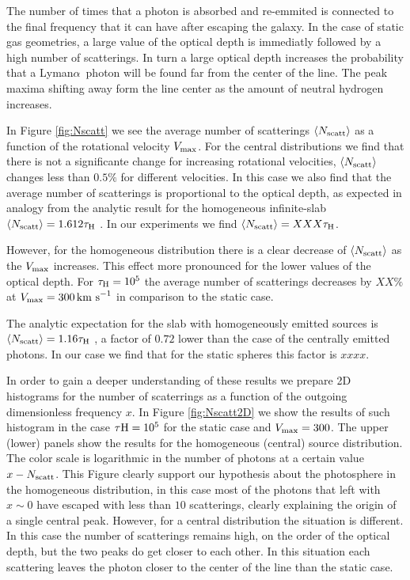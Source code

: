 \documentclass[usenatbib]{mn2e}
\newcommand{\ly}{{\ifmmode{{\rm Ly}\alpha~}\else{Ly$\alpha$~}\fi}}
\newcommand{\lya}{{Lyman$\alpha$~}}
\newcommand{\kms}{{\ifmmode{{\mathrm{\,km\ s}^{-1}}}\else{\,km~s$^{-1}$}\fi}}
\begin{document}
The number of times that a \ly photon is absorbed and re-emmited is
connected to the final frequency that it can have after escaping the
galaxy. In the case of static gas geometries, a large value of the
optical depth is immediatly followed by a high number of
scatterings. In turn a large optical depth increases the probability
that a \lya photon will be found far from the center of the line. The
peak maxima shifting away form the line center as the amount of
neutral hydrogen increases.


In Figure \ref{fig:Nscatt} we see the average number of scatterings
$\langle N_{\rm scatt}\rangle$ as a function of the rotational velocity
$V_{\rm max}$. For the central distributions we find that there is not
a significante change for increasing rotational
velocities, $\langle N_{\rm scatt}\rangle$ changes less than $0.5\%$
for different velocities. In this case we also find that the average
number of scatterings is proportional to the optical depth, as
expected in analogy from the analytic result for the homogeneous
infinite-slab $\langle N_{\rm  scatt}\rangle=1.612\tau_{\rm   H}$
\citep{Adams72,Harrington73}. In our experiments we find  $\langle N_{\rm
  scatt}\rangle= XXX\tau_{\rm   H}$. 


However, for the homogeneous distribution there is a clear decrease of
$\langle N_{\rm  scatt}\rangle$ as the  $V_{\rm max}$ increases. This
effect more pronounced for the lower values of the optical depth. For
$\tau_{\rm H}=10^5$ the average number of scatterings decreases by
$XX\%$ at $V_{\rm max}=300\kms$ in comparison to the static case.


The analytic expectation for the slab with homogeneously emitted
sources is $\langle N_{\rm  scatt}\rangle=1.16\tau_{\rm   H}$
\citep{Harrington73}, a factor of $0.72$ lower than the case of the
centrally emitted photons. In our case we find that for the static
spheres this factor is $xxxx$.

In order to gain a deeper understanding of these results we prepare 2D
histograms for the number of scaterrings as a function of the outgoing
dimensionless frequency $x$. In Figure \ref{fig:Nscatt2D} we show
the results of such histogram in the case $\tau{\rm H}=10^5$ for the
static case and $V_{\rm max}=300$\kms. The upper (lower) panels show the
results for the homogeneous (central) source distribution. The color
scale is logarithmic in the number of photons at a certain value
$x-N_{\rm scatt}$. This Figure clearly support our hypothesis about
the photosphere in the homogeneous distribution, in this case most of
the photons that left with $x\sim 0$ have escaped with less than $10$
scatterings, clearly explaining the origin of a single central
peak. However, for a central distribution the situation is
different. In this case the number of scatterings remains high, on the
order of the optical depth, but the two peaks do get closer to each
other. In this situation each scattering leaves the photon closer to
the center of the line than the static case.
\end{document}
